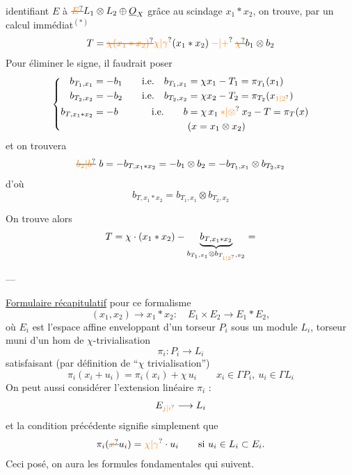 identifiant $E$ à $\deleted{\unsure{E}}L_1\otimes L_2\oplus\underline O_X$ grâce au scindage \uline{$x_1*x_2$}, on trouve, par un calcul immédiat$^{(*)}$
\[
T=\deleted{\unsure{\chi(x_1*x_2)}}\unsure{\chi|\gamma}(x_1*x_2)\mathbin{\unsure{-|+}}\deleted{\unsure{\chi}}b_1\otimes b_2
\]
Pour éliminer le signe, il faudrait poser
\[
\left\{\begin{aligned}
b_{T_1,x_1}&=-b_1&\quad\text{i.e.}\quad b_{T_1,x_1}&=\chi x_1-T_1=\pi_{T_1}(x_1)\\
b_{T_2,x_2}&=-b_2&\text{i.e.}\quad b_{T_2,x_2}&=\chi x_2-T_2=\pi_{T_2}(x_{\unsure{1|2}})\\
b_{T,x_1*x_2}&=-b&\text{i.e.}\qquad b&=\chi\,x_1\mathbin{\unsure{*|\otimes}}x_2-T=\pi_T(x)\\
&&&(x=x_1\otimes x_2)
\end{aligned}\right.
\]
et on trouvera
\[
\deleted{\unsure{b_2|b}}\ b=-b_{T,x_1*x_2}=-b_1\otimes b_2=-b_{T_1,x_1}\otimes b_{T_2,x_2}
\]
d'où
\[
\boxed{b_{T,x_1*x_2}=b_{T_1,x_1}\otimes b_{T_2,x_2}}
\]

On trouve alors
\[
T=\chi\cdot(x_1*x_2)-\underbrace{b_{T,x_1*x_2}}_{b_{T_1,x_1}\otimes b_{T_{\unsure{1|2}},x_2}}=
\]
\centerline{---}
\uline{Formulaire récapitulatif} pour ce formalisme
\[
(x_1,x_2)\longrightarrow x_1*x_2:\quad E_1\times E_2\longrightarrow E_1*E_2,
\]
où $E_i$  est l'espace affine enveloppant d'un torseur $P_i$ sous un module  $L_i$, torseur muni d'un hom de $\chi$-trivialisation 
\[
\pi_i:P_i\longrightarrow L_i
\]
satisfaisant (par définition de ``$\chi$ trivialisation'')
\[
\pi_i(x_i+u_i)=\pi_i(x_i)+\chi\,u_i\qquad x_i\in\Gamma P_i,\ u_i\in\Gamma L_i
\]
On peut aussi considérer l'extension linéaire  $\pi_i$ :
\[
E_{\unsure{j|i}}\longrightarrow L_i
\]
et la condition précédente signifie simplement que
\[
\pi_i(\deleted{\unsure{x}}u_i)=\unsure{\chi|\gamma}\cdot u_i\qquad\text{si }u_i\in L_i\subset E_i.
\]
Ceci posé, on aura les formules fondamentales qui suivent.

